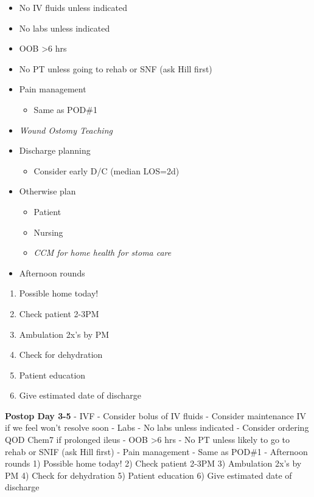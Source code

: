 \documentclass[
]{book}
\providecommand{\tightlist}{%
  \setlength{\itemsep}{0pt}\setlength{\parskip}{0pt}}
\begin{document}
\begin{itemize}
\tightlist
\item
  No IV fluids unless indicated
\item
  No labs unless indicated
\item
  OOB \textgreater6 hrs
\item
  No PT unless going to rehab or SNF (ask Hill first)
\item
  Pain management

  \begin{itemize}
  \tightlist
  \item
    Same as POD\#1
  \end{itemize}
\item
  \emph{Wound Ostomy Teaching}
\item
  Discharge planning

  \begin{itemize}
  \tightlist
  \item
    Consider early D/C (median LOS=2d)
  \end{itemize}
\item
  Otherwise plan

  \begin{itemize}
  \tightlist
  \item
    Patient
  \item
    Nursing
  \item
    \emph{CCM for home health for stoma care}
  \end{itemize}
\item
  Afternoon rounds
\end{itemize}

\begin{enumerate}
\def\labelenumi{\arabic{enumi})}
\tightlist
\item
  Possible home today!
\item
  Check patient 2-3PM
\item
  Ambulation 2x's by PM
\item
  Check for dehydration
\item
  Patient education
\item
  Give estimated date of discharge
\end{enumerate}

\textbf{Postop Day 3-5}
- IVF
- Consider bolus of IV fluids
- Consider maintenance IV if we feel won't resolve soon
- Labs
- No labs unless indicated
- Consider ordering QOD Chem7 if prolonged ileus
- OOB \textgreater6 hrs
- No PT unless likely to go to rehab or SNIF (ask Hill first)
- Pain management
- Same as POD\#1
- Afternoon rounds
1) Possible home today!
2) Check patient 2-3PM
3) Ambulation 2x's by PM
4) Check for dehydration
5) Patient education
6) Give estimated date of discharge
\end{document}
